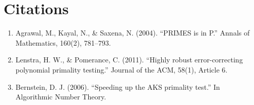 \section{Citations}

\begin{enumerate}
\item Agrawal, M., Kayal, N., \& Saxena, N. (2004). ``PRIMES is in P.'' Annals of Mathematics, 160(2), 781--793.
\item Lenstra, H. W., \& Pomerance, C. (2011). ``Highly robust error-correcting polynomial primality testing.'' Journal of the ACM, 58(1), Article 6.
\item Bernstein, D. J. (2006). ``Speeding up the AKS primality test.'' In Algorithmic Number Theory.
\end{enumerate}
